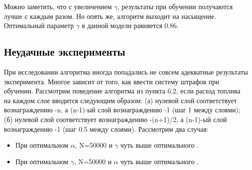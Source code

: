 \documentclass[a4paper]{report}
\theoremstyle{definition}
\theoremstyle{plain}
\theoremstyle{remark}
\theoremstyle{remark}
\theoremstyle{definition}
\begin{document}
Можно заметить, что с увеличением $\gamma$, результаты при обучении получаются лучше с каждым разом. Но опять же, алгоритм выходит на насыщение. Оптимальный параметр $\gamma$ в данной модели равняется 0.86.

\begin{center}
    \subsection{Неудачные эксперименты}
\end{center}

При исследовании алгоритма иногда попадались не совсем адекватные результаты эксперимента. Многое зависит от того, как ввести систему штрафов при обучении. Рассмотрим поведение алгоритма из пункта 6.2, если расход топлива на каждом слое вводится следующим образом: (а) нулевой слой соответствует вознаграждению -n, а (n-1)-ый слой вознаграждению -1 (шаг 1 между слоями); (б) нулевой слой соответствует вознаграждению -(n+1)/2, а (n-1)-ый слой вознаграждению -1 (шаг 0.5 между слоями). Рассмотрим два случая:
\begin{itemize}
    \item При оптимальном $\alpha$, N=50000 и $\gamma$ чуть выше оптимального .
    \item При оптимальном $\gamma$, N=50000 и $\alpha$ чуть выше оптимального .
\end{itemize}
\end{document}
